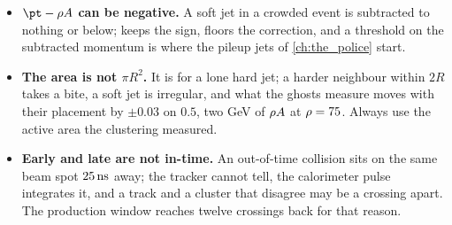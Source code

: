 \begin{pitfalls}
\begin{itemize}[nosep]
    it; a jet in the endcap can be over-subtracted by a \rhoPU measured
    over $|\eta|<5$, and the offset corrections of
    \cref{ch:paying_for_uninvited} are binned in $\eta$ for that reason.
    \rhoPU also feels the signal itself, which raises the median by
    $6\GeV$ per unit area here, and subtracts that with the crowd.
  \item \textbf{$\pt-\rhoPU A$ can be negative.} A soft jet in a crowded
    event is subtracted to nothing or below; \FASTJET keeps the sign,
    \CMSSW floors the correction, and a threshold on the subtracted
    momentum is where the pileup jets of \cref{ch:the_police} start.
  \item \textbf{The area is not $\pi R^2$.} It is for a lone hard
    \antikt jet; a harder neighbour within $2R$ takes a bite, a soft jet
    is irregular, and what the ghosts measure moves with their placement
    by $\pm0.03$ on $0.5$, two GeV of $\rho A$ at $\rho=75$.
    Always use the active area the clustering measured.
  \item \textbf{Early and late are not in-time.} An out-of-time collision
    sits on the same beam spot $25\,\mathrm{ns}$ away; the tracker cannot tell,
    the calorimeter pulse integrates it, and a track and a cluster that
    disagree may be a crossing apart. The production window reaches
    twelve crossings back for that reason.
\end{itemize}
\end{pitfalls}

